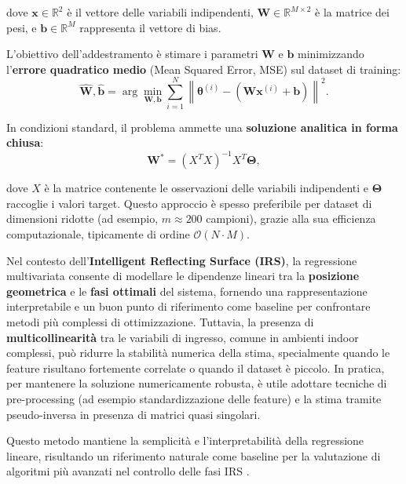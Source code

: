 \documentclass[12pt,a4paper]{report}
\begin{document}
dove $\mathbf{x} \in \mathbb{R}^2$ è il vettore delle variabili
indipendenti, $\mathbf{W} \in \mathbb{R}^{M \times 2}$ è la matrice
dei pesi, e $\mathbf{b} \in \mathbb{R}^M$ rappresenta il vettore di bias.

L'obiettivo dell'addestramento è stimare i parametri $\mathbf{W}$ e
$\mathbf{b}$ minimizzando l'\textbf{errore quadratico medio} (Mean
Squared Error, MSE) sul dataset di training:
\begin{equation}
  \hat{\mathbf{W}}, \hat{\mathbf{b}} =
  \arg\min_{\mathbf{W}, \mathbf{b}}
  \sum_{i=1}^{N}
  \left\|
  \boldsymbol{\theta}^{(i)} -
  \left(\mathbf{W}\mathbf{x}^{(i)} + \mathbf{b}\right)
  \right\|^2.
\end{equation}

In condizioni standard, il problema ammette una \textbf{soluzione
analitica in forma chiusa}:
\begin{equation}
  \mathbf{W}^* = (X^T X)^{-1} X^T \boldsymbol{\Theta},
\end{equation}

dove $X$ è la matrice contenente le osservazioni delle variabili
indipendenti e $\boldsymbol{\Theta}$ raccoglie i valori target.
Questo approccio è spesso preferibile per dataset di dimensioni
ridotte (ad esempio, $m \approx 200$ campioni), grazie alla sua
efficienza computazionale, tipicamente di ordine $\mathcal{O}(N \cdot M)$.

Nel contesto dell'\textbf{Intelligent Reflecting Surface (IRS)}, la
regressione multivariata consente di modellare le dipendenze lineari
tra la \textbf{posizione geometrica} e le \textbf{fasi ottimali} del
sistema, fornendo una rappresentazione interpretabile e un buon punto
di riferimento come baseline per confrontare metodi più complessi di
ottimizzazione. Tuttavia, la presenza di \textbf{multicollinearità}
tra le variabili di ingresso, comune in ambienti indoor complessi,
può ridurre la stabilità numerica della stima, specialmente quando le
feature risultano fortemente correlate o quando il dataset è piccolo.
In pratica, per mantenere la soluzione numericamente robusta, è utile
adottare tecniche di pre-processing (ad esempio standardizzazione
delle feature) e la stima tramite pseudo-inversa in presenza di
matrici quasi singolari.

Questo metodo mantiene la semplicità e l'interpretabilità della
regressione lineare, risultando un riferimento naturale come baseline
per la valutazione di algoritmi più avanzati nel controllo delle fasi
IRS \cite{hastie2009esl}.
\end{document}
